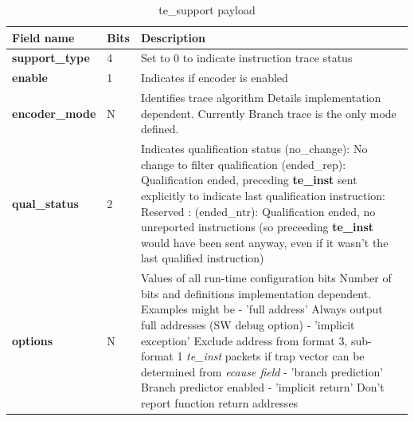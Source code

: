 \begin{table}[!h]
    \centering
    \caption{te\_support payload}
    \label{tab:te_support}
    \begin{tabulary}{\textwidth}{|l|p{8mm}|p{80mm}|}
        \hline
        \textbf {Field name} & \textbf {Bits} & \textbf {Description} \\
        \hline
        \textbf{support\_type} & 4 & Set to 0 to indicate instruction trace status \\
        \hline
        \textbf{enable} & 1 & Indicates if encoder is enabled\\
        \hline
        \textbf{encoder\_mode} & N & Identifies trace algorithm\newline
          Details implementation dependent.  Currently Branch trace is the only mode defined.\\
        \hline
        \textbf{qual\_status} & 2 & Indicates qualification status (no\_change): No change to filter qualification  (ended\_rep): Qualification ended, preceding \textbf{te\_inst} sent explicitly to indicate last qualification instruction: Reserved : (ended\_ntr): Qualification ended, no unreported instructions (so preceeding \textbf{te\_inst} would have been sent anyway, even if it wasn't the last qualified instruction)\\
        \hline
        \textbf{options} & N & Values of all run-time configuration bits\newline
          Number of bits and definitions implementation dependent.  Examples might be\newline
          - 'full address' Always output full addresses (SW debug option)\newline
          - 'implicit exception' Exclude address from format 3, sub-format 1 \textit{te\_inst} packets if trap vector can be determined from \textit{ecause field}\newline
          - 'branch prediction' Branch predictor enabled\newline
          - 'implicit return' Don't report function return addresses\\
          \hline
    \end{tabulary}
\end{table}

